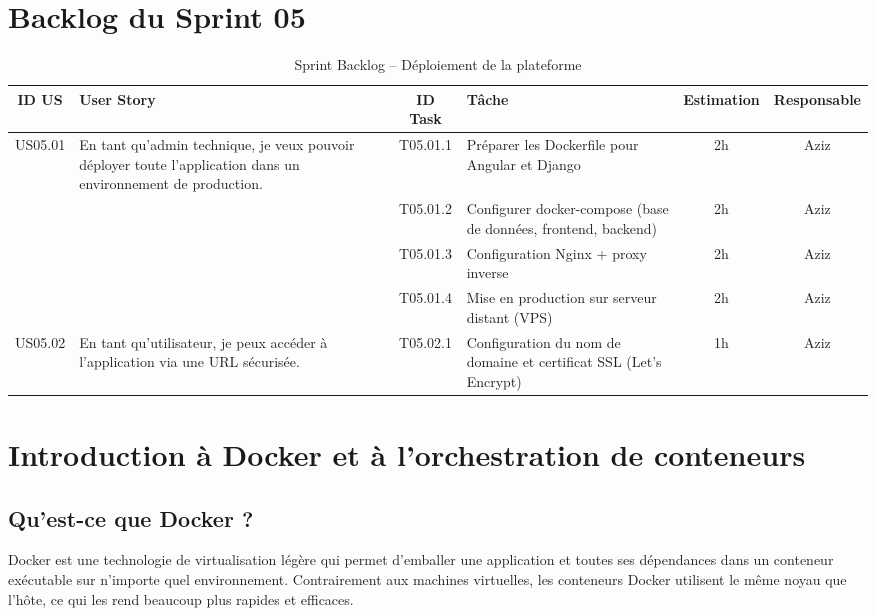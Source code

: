 \section*{Backlog du Sprint 05}
\begin{table}[H]
\centering
\begin{tabular}{|c|p{5cm}|c|p{5.5cm}|c|c|}
\hline
\textbf{ID US} & \textbf{User Story} & \textbf{ID Task} & \textbf{Tâche} & \textbf{Estimation} & \textbf{Responsable} \\
\hline

US05.01 & En tant qu’admin technique, je veux pouvoir déployer toute l’application dans un environnement de production.
        & T05.01.1 & Préparer les Dockerfile pour Angular et Django & 2h & Aziz \\
        \cline{3-6}
        & & T05.01.2 & Configurer docker-compose (base de données, frontend, backend) & 2h & Aziz \\
        \cline{3-6}
        & & T05.01.3 & Configuration Nginx + proxy inverse & 2h & Aziz \\
        \cline{3-6}
        & & T05.01.4 & Mise en production sur serveur distant (VPS) & 2h & Aziz \\
\hline

US05.02 & En tant qu’utilisateur, je peux accéder à l'application via une URL sécurisée.
        & T05.02.1 & Configuration du nom de domaine et certificat SSL (Let's Encrypt) & 1h & Aziz \\
\hline

\end{tabular}
\caption{Sprint Backlog – Déploiement de la plateforme}
\end{table}

\section{Introduction à Docker et à l’orchestration de conteneurs}

\subsection*{Qu’est-ce que Docker ?}
Docker est une technologie de virtualisation légère qui permet d’emballer une application et toutes ses dépendances dans un conteneur exécutable sur n’importe quel environnement. Contrairement aux machines virtuelles, les conteneurs Docker utilisent le même noyau que l’hôte, ce qui les rend beaucoup plus rapides et efficaces.

